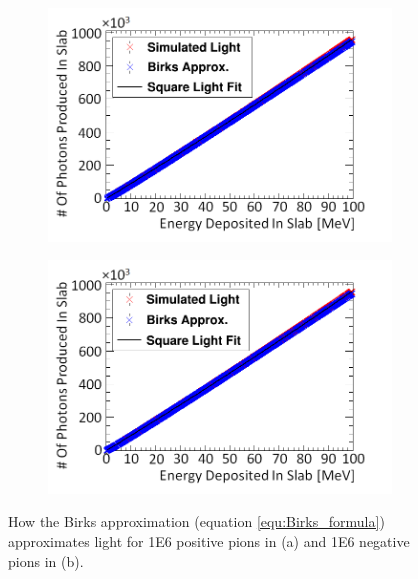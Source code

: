 \begin{figure}[htbp]
\centering
\begin{subfigure}{.5\textwidth}
  \centering
  \includegraphics[width=\linewidth]{Appendix5/newNewFigs/pi+BirksSlab_simAndApproxLight.png}
  \captionsetup{width=.9\linewidth}
  \caption{}
  \label{subfig:append5_light_of_pIPlus0-100mev}
\end{subfigure}%
\begin{subfigure}{.5\textwidth}
  \centering
  \includegraphics[width=\linewidth]{Appendix5/newNewFigs/pi-BirksSlab_simAndApproxLight.png}
  \captionsetup{width=.9\linewidth}
  \caption{}
  \label{subfig:append5_light_of_pIMinus0-100mev}
\end{subfigure}
\caption[Birks' light approximation for pion particles compared to simulation.]{How the Birks approximation (equation \ref{equ:Birks_formula}) approximates light for 1E6 positive pions in (a) and 1E6 negative pions in (b).}
\label{fig:append5_light_of_pIPlus_pIMinus0-100mev}
\end{figure}

